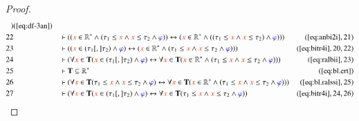 \begin{proof}
\begin{align}
      )&(\mbox{\ref{eq:df-3an}})\notag
  \\ 22 &&  & \vdash ( ( \msc{x} \in \mathbb{R}^{\ast} \wedge ( \tau_1 \le \msc{x}
      \wedge \msc{x} \le \tau_2 \wedge \mw{\varphi} ) )
      \leftrightarrow ( \msc{x} \in \mathbb{R}^{\ast} \wedge (
      ( \tau_1 \le \msc{x} \wedge \msc{x} \le \tau_2 )
      \wedge \mw{\varphi} ) )
      )&(\mbox{\ref{eq:anbi2i}},21)\notag
  \\ 23 &&  & \vdash ( ( \msc{x} \in ( \tau_1 [,] \tau_2 ) \wedge \mw{\varphi}
      ) \leftrightarrow ( \msc{x} \in \mathbb{R}^{\ast} \wedge
      ( \tau_1 \le \msc{x} \wedge \msc{x} \le \tau_2 \wedge
      \mw{\varphi} ) )
      )&(\mbox{\ref{eq:bitr4i}},20,22)\notag
  \\ 24 &&  & \vdash ( \forall \msc{x} \in \mathbf{T} ( \msc{x} \in ( \tau_1
      [,] \tau_2 ) \wedge \mw{\varphi} ) \leftrightarrow
      \forall \msc{x} \in \mathbf{T} ( \msc{x} \in
      \mathbb{R}^{\ast} \wedge ( \tau_1 \le \msc{x} \wedge
      \msc{x} \le \tau_2 \wedge \mw{\varphi} ) )
      )&(\mbox{\ref{eq:ralbii}},23)\notag
  \\ 25 &&  & \vdash \mathbf{T} \subseteq
      \mathbb{R}^{\ast}&(\mbox{\ref{eq:bl.ert}})\notag
  \\ 26 &&  & \vdash ( \forall \msc{x} \in \mathbf{T} ( \tau_1 \le \msc{x}
      \wedge \msc{x} \le \tau_2 \wedge \mw{\varphi} )
      \leftrightarrow \forall \msc{x} \in \mathbf{T} (
      \msc{x} \in \mathbb{R}^{\ast} \wedge ( \tau_1 \le
      \msc{x} \wedge \msc{x} \le \tau_2 \wedge \mw{\varphi}
      ) ) )&(\mbox{\ref{eq:bl.ralssi}},25)\notag
  \\ 27 &&  & \vdash ( \forall \msc{x} \in \mathbf{T} ( \msc{x} \in ( \tau_1
      [,] \tau_2 ) \wedge \mw{\varphi} ) \leftrightarrow
      \forall \msc{x} \in \mathbf{T} ( \tau_1 \le \msc{x}
      \wedge \msc{x} \le \tau_2 \wedge \mw{\varphi} )
      )&(\mbox{\ref{eq:bitr4i}},24,26)\notag
\end{align}
\end{proof}

\blallcd

